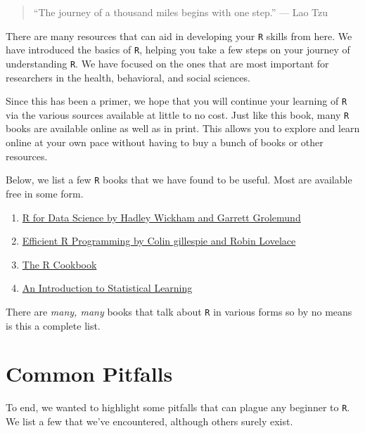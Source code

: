 \documentclass[]{tufte-book}
\providecommand{\tightlist}{%
  \setlength{\itemsep}{0pt}\setlength{\parskip}{0pt}}
\theoremstyle{definition}
\theoremstyle{definition}
\theoremstyle{remark}
\begin{document}
\begin{quote}
``The journey of a thousand miles begins with one step.'' --- Lao Tzu
\end{quote}

There are many resources that can aid in developing your \texttt{R}
skills from here. We have introduced the basics of \texttt{R}, helping
you take a few steps on your journey of understanding \texttt{R}. We
have focused on the ones that are most important for researchers in the
health, behavioral, and social sciences.

Since this has been a primer, we hope that you will continue your
learning of \texttt{R} via the various sources available at little to no
cost. Just like this book, many \texttt{R} books are available online as
well as in print. This allows you to explore and learn online at your
own pace without having to buy a bunch of books or other resources.

Below, we list a few \texttt{R} books that we have found to be useful.
Most are available free in some form.

\begin{enumerate}
\def\labelenumi{\arabic{enumi}.}
\tightlist
\item
  \href{http://r4ds.had.co.nz/}{R for Data Science by Hadley Wickham and
  Garrett Grolemund}
\item
  \href{https://csgillespie.github.io/efficientR/}{Efficient R
  Programming by Colin gillespie and Robin Lovelace}
\item
  \href{http://www.cookbook-r.com/}{The R Cookbook}
\item
  \href{http://www-bcf.usc.edu/~gareth/ISL/}{An Introduction to
  Statistical Learning}
\end{enumerate}

There are \emph{many, many} books that talk about \texttt{R} in various
forms so by no means is this a complete list.

\section*{Common Pitfalls}\label{common-pitfalls}

To end, we wanted to highlight some pitfalls that can plague any
beginner to \texttt{R}. We list a few that we've encountered, although
others surely exist.
\end{document}
